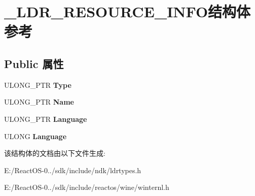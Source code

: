 \hypertarget{struct___l_d_r___r_e_s_o_u_r_c_e___i_n_f_o}{}\section{\+\_\+\+L\+D\+R\+\_\+\+R\+E\+S\+O\+U\+R\+C\+E\+\_\+\+I\+N\+F\+O结构体 参考}
\label{struct___l_d_r___r_e_s_o_u_r_c_e___i_n_f_o}
\subsection*{Public 属性}
\begin{DoxyCompactItemize}
\item 
\mbox{\label{struct___l_d_r___r_e_s_o_u_r_c_e___i_n_f_o_afdfc0cf879f4769307eebe80ec7c314a}} 
U\+L\+O\+N\+G\+\_\+\+P\+TR {\bfseries Type}
\item 
\mbox{\label{struct___l_d_r___r_e_s_o_u_r_c_e___i_n_f_o_ab4708108cd30367ecc03af1aed782bad}} 
U\+L\+O\+N\+G\+\_\+\+P\+TR {\bfseries Name}
\item 
\mbox{\label{struct___l_d_r___r_e_s_o_u_r_c_e___i_n_f_o_a196ceb5a77fcc1cf998da030e3726e27}} 
U\+L\+O\+N\+G\+\_\+\+P\+TR {\bfseries Language}
\item 
\mbox{\label{struct___l_d_r___r_e_s_o_u_r_c_e___i_n_f_o_a83c1b08e415d0166595657b0f6d8ba4e}} 
U\+L\+O\+NG {\bfseries Language}
\end{DoxyCompactItemize}


该结构体的文档由以下文件生成\+:\begin{DoxyCompactItemize}
\item 
E\+:/\+React\+O\+S-\/0../sdk/include/ndk/ldrtypes.\+h\item 
E\+:/\+React\+O\+S-\/0../sdk/include/reactos/wine/winternl.\+h\end{DoxyCompactItemize}
